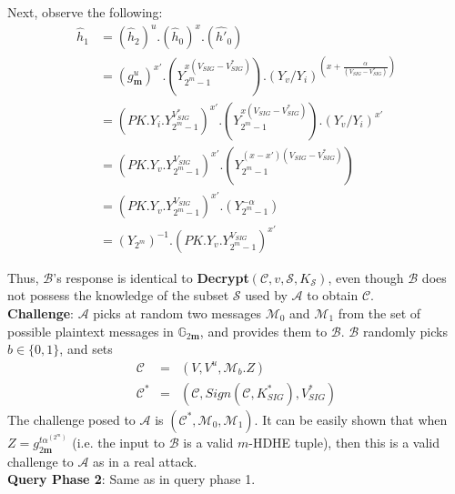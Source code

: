 \noindent Next, observe the following:
\begin{equation}
\begin{split}
  \hat{h}_1&=\left(\hat{h}_2\right)^u.\left(\hat{h}_0\right)^x.\left(\hat{h'}_0\right)\\
  &=\left(g^{u}_{\mathbf{m}}\right)^{x'}.\left(Y^{x\left(V_{SIG}-V^{*}_{SIG}\right)}_{2^m-1}\right).\left(Y_{v}/Y_{i}\right)^{\left(x+\frac{\alpha}{(V_{SIG}-V^{*}_{SIG})}\right)}\\
  &= \left(PK.Y_i.Y^{V^{*}_{SIG}}_{2^m-1}\right)^{x'}.\left(Y^{x\left(V_{SIG}-V^{*}_{SIG}\right)}_{2^m-1}\right).\left(Y_{v}/Y_{i}\right)^{x'}\\
  &= \left(PK.Y_v.Y^{V_{SIG}}_{2^m-1}\right)^{x'}.\left(Y^{\left(x-x'\right)\left(V_{SIG}-V^{*}_{SIG}\right)}_{2^m-1}\right)\\
  &= \left(PK.Y_v.Y^{V_{SIG}}_{2^m-1}\right)^{x'}.\left(Y^{-\alpha}_{2^m-1}\right)\\
  &= \left({Y_{2^m}}\right)^{-1}.\left(PK.Y_v.Y^{V_{SIG}}_{2^m-1}\right)^{x'}\nonumber
\end{split}
\end{equation}
 

\noindent Thus, $\mathcal{B}$'s response is identical to \textbf{Decrypt}$(\mathcal{C},v,\mathcal{S},K_{\mathcal{S}})$, even though $\mathcal{B}$ does not possess the knowledge of the subset $\mathcal{S}$ used by $\mathcal{A}$ to obtain $\mathcal{C}$.\\
 
\noindent \textbf{Challenge}: $\mathcal{A}$ picks at random two messages $\mathcal{M}_0$ and $\mathcal{M}_1$ from the set of possible plaintext messages in $\mathbb{G}_{2\mathbf{m}}$, and provides them to $\mathcal{B}$. $\mathcal{B}$ randomly picks $b\in\{0,1\}$, and sets 
\begin{eqnarray}
 \mathcal{C}&=&(V,V^u,\mathcal{M}_b.Z) \nonumber\\
 \mathcal{C}^{*}&=&(\mathcal{C},Sign(\mathcal{C},K^{*}_{SIG}),V^{*}_{SIG})\nonumber
\end{eqnarray}
\noindent The challenge posed to $\mathcal{A}$ is $(\mathcal{C}^{*},\mathcal{M}_0,\mathcal{M}_1)$. It can be easily shown that when $Z=g^{t\alpha^{(2^m)}}_{2\mathbf{m}}$ (i.e. the input to $\mathcal{B}$ is a valid $m$-HDHE tuple), then this is a valid challenge to $\mathcal{A}$ as in a real attack.\\

\noindent\textbf{Query Phase 2}: Same as in query phase 1.\\
 
